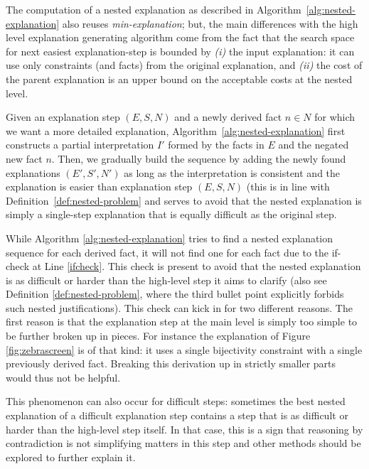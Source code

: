 The computation of a nested explanation as described in Algorithm~\ref{alg:nested-explanation} also reuses \textit{min-explanation}; but, the main differences with the high level explanation generating algorithm come from the fact that the search space for next easiest explanation-step is bounded by \emph{(i)} the input explanation: it can use only constraints (and facts) from the original explanation, and \emph{(ii)} the cost of the parent explanation is an upper bound on the acceptable costs at the nested level. 

Given an explanation step $(E, S, N)$ and a newly derived fact $n \in N$ for which we want a more detailed explanation, Algorithm~\ref{alg:nested-explanation} first constructs a partial interpretation $I'$ formed by the facts in $E$ and the negated new fact $n$. 
Then, we gradually build the sequence by adding the newly found explanations $(E', S', N')$ as long as the interpretation is consistent and the explanation is easier than explanation step $(E, S, N)$ (this is in line with Definition~\ref{def:nested-problem} and serves to avoid that the nested explanation is simply a single-step explanation that is equally difficult as the original step.  

While Algorithm \ref{alg:nested-explanation} tries to find a nested explanation sequence for each derived fact, it will not find one for each fact due to the if-check at Line \ref{ifcheck}. 
This check is present to avoid that the nested explanation is as difficult or harder than the high-level step it aims to clarify (also see Definition \ref{def:nested-problem}, where the third bullet point explicitly forbids such nested justifications).  
This check can kick in for two different reasons. The first reason is that the explanation step at the main level is simply too simple to be further broken up in pieces. For instance the explanation of Figure \ref{fig:zebrascreen} is of that kind: it uses a single bijectivity constraint with a single previously derived fact. Breaking this derivation up in strictly smaller parts would thus not be helpful. 

This phenomenon can also occur for difficult steps: sometimes the best nested explanation of a difficult explanation step contains a step that is as difficult or harder than the high-level step itself. In that case, this is a sign that reasoning by contradiction is not simplifying matters in this step and other methods should be explored to further explain it.

